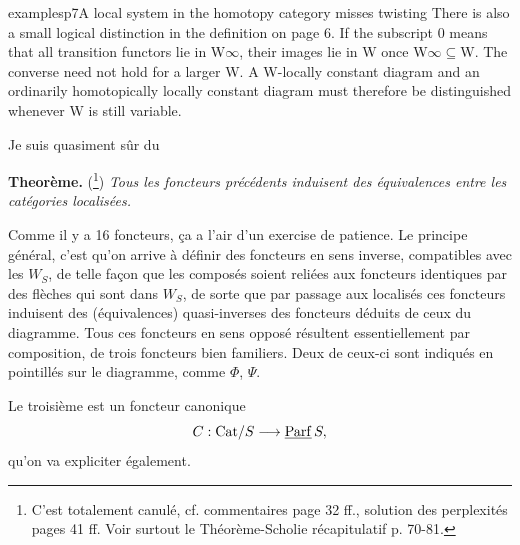 \begin{dcomment}{examples}{p7}{A local system in the homotopy category misses twisting}
There is also a small logical distinction in the definition on page 6. If the subscript 0 means that all transition functors lie in W\ensuremath{\infty}, their images lie in W once W\ensuremath{\infty}\ensuremath{\subseteq}W. The converse need not hold for a larger W. A W-locally constant diagram and an ordinarily homotopically locally constant diagram must therefore be distinguished whenever W is still variable.

\end{dcomment}




Je suis quasiment sûr du

\textbf{Theorème.} (\footnote[6]{C'est totalement canulé, cf. commentaires page 32 ff., solution des perplexités pages 41 ff. Voir surtout le Théorème-Scholie récapitulatif p. 70-81.}) \textit{Tous les foncteurs précédents induisent des équivalences entre les catégories localisées.} %

Comme il y a 16 foncteurs, ça a l'air d'un exercise de patience. Le principe général, c'est qu'on arrive à définir des foncteurs en sens inverse, compatibles avec les $W_S$, de telle façon que les composés soient reliées aux foncteurs identiques par des flèches qui sont dans $W_S$, de sorte que par passage aux localisés ces foncteurs induisent des (équivalences) quasi-inverses des foncteurs déduits de ceux du diagramme. Tous ces foncteurs en sens opposé résultent essentiellement par composition, de trois foncteurs bien familiers. Deux de ceux-ci sont indiqués en pointillés sur le diagramme, comme $\Phi$, $\Psi$. %

Le troisième est un foncteur canonique
\[
C : \mathrm{Cat}/S \longrightarrow \underline{\mathrm{Parf}}\,S,
\]
qu'on va expliciter également.

